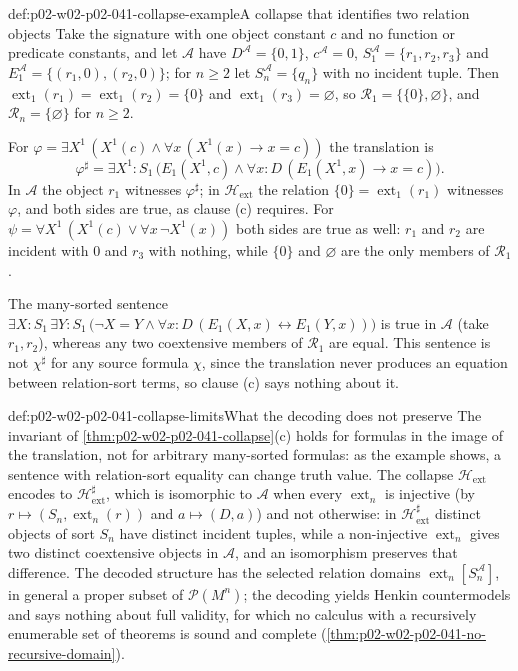 \begin{hbexample}{def:p02-w02-p02-041-collapse-example}{A collapse that identifies two relation objects}
Take the signature with one object constant \(c\) and no function or predicate
constants, and let \(\mathcal A\) have \(D^{\mathcal A}=\{0,1\}\),
\(c^{\mathcal A}=0\), \(S_1^{\mathcal A}=\{r_1,r_2,r_3\}\) and
\(E_1^{\mathcal A}=\{(r_1,0),(r_2,0)\}\); for \(n\geq2\) let
\(S_n^{\mathcal A}=\{q_n\}\) with no incident tuple.  Then
\(\operatorname{ext}_1(r_1)=\operatorname{ext}_1(r_2)=\{0\}\) and
\(\operatorname{ext}_1(r_3)=\varnothing\), so
\(\mathcal R_1=\{\{0\},\varnothing\}\), and
\(\mathcal R_n=\{\varnothing\}\) for \(n\geq2\).

For \(\varphi=\exists X^1\,(X^1(c)\land\forall x\,(X^1(x)\to x=c))\) the
translation is
\[
 \varphi^\sharp=\exists X^1{:}S_1\,\bigl(E_1(X^1,c)\land\forall x{:}D\,(E_1(X^1,x)\to x=c)\bigr).
\]
In \(\mathcal A\) the object \(r_1\) witnesses \(\varphi^\sharp\); in
\(\mathcal H_{\mathrm{ext}}\) the relation \(\{0\}=\operatorname{ext}_1(r_1)\)
witnesses \(\varphi\), and both sides are true, as clause (c) requires.  For
\(\psi=\forall X^1\,(X^1(c)\lor\forall x\,\neg X^1(x))\) both sides are true
as well: \(r_1\) and \(r_2\) are incident with \(0\) and \(r_3\) with nothing,
while \(\{0\}\) and \(\varnothing\) are the only members of \(\mathcal R_1\).

The many-sorted sentence
\(\exists X{:}S_1\,\exists Y{:}S_1\,\bigl(\neg X=Y\land\forall x{:}D\,(E_1(X,x)\leftrightarrow E_1(Y,x))\bigr)\)
is true in \(\mathcal A\) (take \(r_1,r_2\)), whereas any two coextensive
members of \(\mathcal R_1\) are equal.  This sentence is not \(\chi^\sharp\)
for any source formula \(\chi\), since the translation never produces an
equation between relation-sort terms, so clause (c) says nothing about it.
\end{hbexample}

\begin{hbwarning}{def:p02-w02-p02-041-collapse-limits}{What the decoding does not preserve}
The invariant of \cref{thm:p02-w02-p02-041-collapse}(c) holds for formulas in
the image of the translation, not for arbitrary many-sorted formulas: as the
example shows, a sentence with relation-sort equality can change truth value.
The collapse \(\mathcal H_{\mathrm{ext}}\) encodes to
\(\mathcal H_{\mathrm{ext}}^\sharp\), which is isomorphic to \(\mathcal A\)
when every \(\operatorname{ext}_n\) is injective (by
\(r\mapsto(S_n,\operatorname{ext}_n(r))\) and \(a\mapsto(D,a)\)) and not
otherwise: in \(\mathcal H_{\mathrm{ext}}^\sharp\) distinct objects of sort
\(S_n\) have distinct incident tuples, while a non-injective
\(\operatorname{ext}_n\) gives two distinct coextensive objects in
\(\mathcal A\), and an isomorphism preserves that difference.  The decoded structure has the selected relation domains
\(\operatorname{ext}_n[S_n^{\mathcal A}]\), in general a proper subset of
\(\mathcal P(M^n)\); the decoding yields Henkin countermodels and says nothing
about full validity, for which no calculus with a recursively enumerable set of
theorems is sound and complete
(\cref{thm:p02-w02-p02-041-no-recursive-domain}).
\end{hbwarning}


